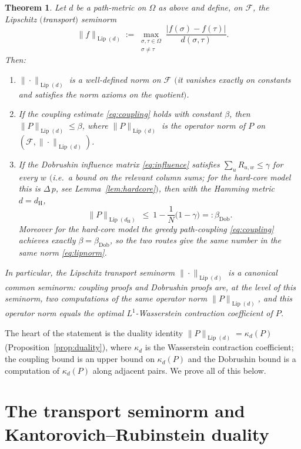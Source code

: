 \documentclass{amsart}
\newtheorem{theorem}{Theorem}
\DeclareMathOperator{\Lip}{Lip}
\newcommand{\Om}{\Omega}
\begin{document}
\begin{theorem}\label{thm:main}
Let $d$ be a path-metric on $\Om$ as above and define, on $\mathcal F$, the
\emph{Lipschitz $($transport$)$ seminorm}
\begin{equation}\label{eq:lipnorm}
\|f\|_{\Lip(d)}:=\max_{\substack{\sigma,\tau\in\Om\\\sigma\neq\tau}}
\frac{|f(\sigma)-f(\tau)|}{d(\sigma,\tau)} .
\end{equation}
Then:
\begin{enumerate}
\item[\rm(0)] $\|\cdot\|_{\Lip(d)}$ is a well-defined norm on $\mathcal F$
$($it vanishes exactly on constants and satisfies the norm axioms on the
quotient$)$.
\item[\rm(i)] If the coupling estimate \eqref{eq:coupling} holds with constant
$\beta$, then $\|P\|_{\Lip(d)}\le\beta$, where $\|P\|_{\Lip(d)}$ is the operator
norm of $P$ on $(\mathcal F,\|\cdot\|_{\Lip(d)})$.
\item[\rm(ii)] If the Dobrushin influence matrix \eqref{eq:influence} satisfies
$\sum_{u}R_{u,w}\le \gamma$ for every $w$ $($i.e.\ a bound on the relevant
column sums; for the hard-core model this is $\Delta\,p$, see
Lemma~\ref{lem:hardcore}$)$, then with the Hamming metric $d=d_{\mathrm H}$,
\[
\|P\|_{\Lip(d_{\mathrm H})}\ \le\ 1-\frac1N\big(1-\gamma\big)=:\beta_{\mathrm{Dob}} .
\]
Moreover for the hard-core model the greedy path-coupling \eqref{eq:coupling}
achieves exactly $\beta=\beta_{\mathrm{Dob}}$, so the two routes give the
\emph{same} number in the \emph{same} norm \eqref{eq:lipnorm}.
\end{enumerate}
In particular, the Lipschitz transport seminorm
$\|\cdot\|_{\Lip(d)}$ is a canonical common seminorm: coupling proofs and
Dobrushin proofs are, at the level of this seminorm, two computations of the same
operator norm $\|P\|_{\Lip(d)}$, and this operator norm equals the optimal
$L^1$-Wasserstein contraction coefficient of $P$.
\end{theorem}

The heart of the statement is the duality identity
$\|P\|_{\Lip(d)}=\kappa_d(P)$ (Proposition~\ref{prop:duality}), where $\kappa_d$
is the Wasserstein contraction coefficient; the coupling bound is an upper bound
on $\kappa_d(P)$ and the Dobrushin bound is a computation of $\kappa_d(P)$ along
adjacent pairs. We prove all of this below.

\section{The transport seminorm and Kantorovich--Rubinstein duality}
\end{document}
